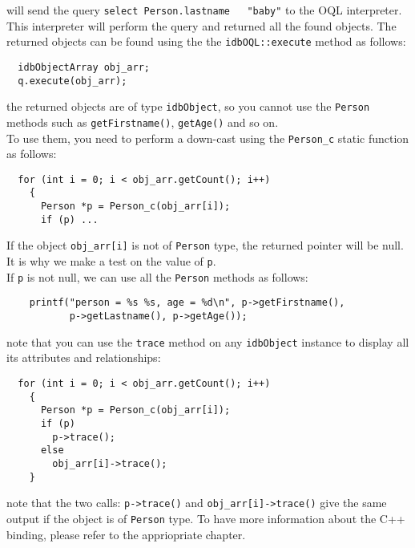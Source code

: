 \normalsize
will send the query \texttt{select Person.lastname ~ "baby"} to the OQL interpreter.\\
This interpreter will perform the query and returned all the found objects.
The returned objects can be found using the the \texttt{idbOQL::execute} method
as follows:
\verbsize \begin{verbatim}
  idbObjectArray obj_arr;
  q.execute(obj_arr);
\end{verbatim}
\normalsize
\item the returned objects are of type \texttt{idbObject}, so you cannot use the
\texttt{Person} methods such as \texttt{getFirstname()}, \texttt{getAge()} and
so on.\\
To use them, you need to perform a down-cast using the \texttt{Person\_c} static
function as follows:
\verbsize \begin{verbatim}
  for (int i = 0; i < obj_arr.getCount(); i++)
    {
      Person *p = Person_c(obj_arr[i]);
      if (p) ...
\end{verbatim}
\normalsize
If the object \texttt{obj\_arr[i]} is not of \texttt{Person} type, the returned
pointer will be null. It is why we make a test on the value of \texttt{p}.\\
If \texttt{p} is not null, we can use all the \texttt{Person} methods as follows:
\verbsize \begin{verbatim}
    printf("person = %
           p->getLastname(), p->getAge());
\end{verbatim}
\normalsize
\item note that you can use the \texttt{trace} method on any \texttt{idbObject}
instance to display all its attributes and relationships:
\verbsize \begin{verbatim}
  for (int i = 0; i < obj_arr.getCount(); i++)
    {
      Person *p = Person_c(obj_arr[i]);
      if (p)
        p->trace();
      else
        obj_arr[i]->trace();
    }
\end{verbatim}
\normalsize
note that the two calls: \texttt{p->trace()} and \texttt{obj\_arr[i]->trace()}
give the same output if the object is of \texttt{Person} type.
\ee
To have more information about the C++ binding, please refer to the
appriopriate chapter.

